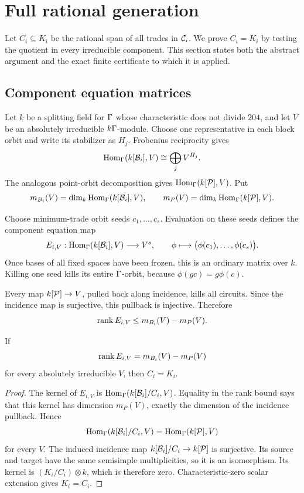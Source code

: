 \section{Full rational generation}
\label{sec:rational-generation}

Let \(C_i\subseteq K_i\) be the rational span of all trades in
\(\mathcal C_i\).  We prove \(C_i=K_i\) by testing the quotient in every
irreducible component.  This section states both the abstract argument
and the exact finite certificate to which it is applied.

\subsection{Component equation matrices}

Let \(k\) be a splitting field for \(\Gamma\) whose characteristic does
not divide \(204\), and let \(V\) be an absolutely irreducible
\(k\Gamma\)-module.  Choose one representative in each block orbit and
write its stabilizer as \(H_j\).  Frobenius reciprocity gives
\[
\operatorname{Hom}_{\Gamma}(k[\mathcal B_i],V)
 \cong \bigoplus_j V^{H_j}.
\]
The analogous point-orbit decomposition gives
\(\operatorname{Hom}_{\Gamma}(k[\mathcal P],V)\).  Put
\[
 m_{B_i}(V)=\dim_k\operatorname{Hom}_{\Gamma}(k[\mathcal B_i],V),
 \qquad
 m_P(V)=\dim_k\operatorname{Hom}_{\Gamma}(k[\mathcal P],V).
\]

Choose minimum-trade orbit seeds \(c_1,\ldots,c_s\).  Evaluation on these
seeds defines the component equation map
\[
 E_{i,V}:\operatorname{Hom}_{\Gamma}(k[\mathcal B_i],V)
 \longrightarrow V^s,
 \qquad
 \phi\longmapsto
 \bigl(\phi(c_1),\ldots,\phi(c_s)\bigr).
\]
Once bases of all fixed spaces have been frozen, this is an ordinary
matrix over \(k\).  Killing one seed kills its entire \(\Gamma\)-orbit,
because \(\phi(gc)=g\phi(c)\).

Every map \(k[\mathcal P]\to V\), pulled back along incidence, kills all
circuits.  Since the incidence map is surjective, this pullback is
injective.  Therefore
\[
 \operatorname{rank} E_{i,V}\le m_{B_i}(V)-m_P(V).
\]

\begin{lemma}
\label{lem:component-rank}
If
\[
 \operatorname{rank} E_{i,V}=m_{B_i}(V)-m_P(V)
\]
for every absolutely irreducible \(V\), then \(C_i=K_i\).
\end{lemma}

\begin{proof}
The kernel of \(E_{i,V}\) is
\(\operatorname{Hom}_{\Gamma}(k[\mathcal B_i]/C_i,V)\).  Equality in the rank bound says that
this kernel has dimension \(m_P(V)\), exactly the dimension of the
incidence pullback.  Hence
\[
\operatorname{Hom}_{\Gamma}(k[\mathcal B_i]/C_i,V)
 =\operatorname{Hom}_{\Gamma}(k[\mathcal P],V)
\]
for every \(V\).  The induced incidence map
\(k[\mathcal B_i]/C_i\to k[\mathcal P]\) is surjective.  Its source and target have the
same semisimple multiplicities, so it is an isomorphism.  Its kernel is
\((K_i/C_i)\otimes k\), which is therefore zero.  Characteristic-zero
scalar extension gives \(K_i=C_i\).
\end{proof}


